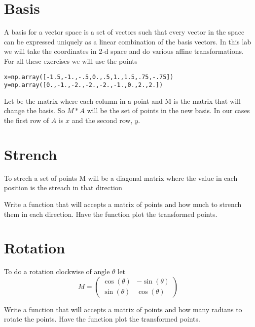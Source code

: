 \label{lab:ChangeBasis}


\section*{Basis}

A basis for a vector space is a set of vectors such that every vector in the space can be expressed uniquely as a linear combination of the basis vectors. In this lab we will take the coordinates in 2-d space and do various affine transformations. For all these exercises we will use the points
\begin{lstlisting}
x=np.array([-1.5,-1.,-.5,0.,.5,1.,1.5,.75,-.75])
y=np.array([0.,-1.,-2.,-2.,-2.,-1.,0.,2.,2.])
\end{lstlisting}
Let be the matrix where each column in a point and M is the matrix that will change the basis. So $M*A$ will be the set of points in the new basis. In our cases the first row of $A$ is $x$ and the second row, $y$. 

\section*{Strench}
To strech a set of points M will be a diagonal matrix where the value in each position is the streach in that direction

\begin{problem}
Write a function that will accepts a matrix of points and how much to strench them in each direction. Have the function plot the transformed points.
\end{problem}

\section*{Rotation}
To do a rotation clockwise of angle $\theta$ let
\[
M = \begin{pmatrix}
\cos(\theta) & -\sin(\theta) \\
\sin(\theta) & \cos(\theta) 
\end{pmatrix}
\]


\begin{problem}
Write a function that will accepts a matrix of points and how many radians to rotate the points. Have the function plot the transformed points.
\end{problem}

